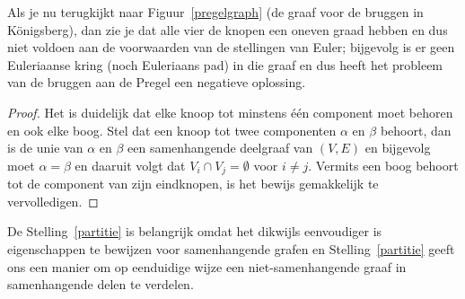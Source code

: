 Als je nu terugkijkt naar Figuur~\ref{pregelgraph} (de graaf voor de bruggen in K\"onigsberg), dan zie je dat
alle vier de knopen een oneven graad hebben en dus niet voldoen aan de
voorwaarden van de stellingen van Euler; bijgevolg is er geen
Euleriaanse kring (noch Euleriaans pad) in die graaf en dus heeft het
probleem van de bruggen aan de Pregel een negatieve oplossing.







\begin{proof} Het is duidelijk dat elke knoop tot minstens
\'{e}\'{e}n component moet behoren en ook elke boog. Stel dat een
knoop tot twee componenten $\alpha$ en $\beta$ behoort, dan is de unie
van $\alpha$ en $\beta$ een samenhangende deelgraaf van $(V,E)$ en
bijgevolg moet $\alpha = \beta$ en daaruit volgt dat $V_{i} \cap V_{j}
= \emptyset$ voor $i \neq j$. Vermits een boog behoort tot de
component van zijn eindknopen, is het bewijs gemakkelijk te vervolledigen.
\end{proof}


De Stelling~\ref{partitie} is belangrijk omdat het dikwijls
eenvoudiger is eigenschappen te bewijzen voor samenhangende grafen en
Stelling~\ref{partitie} geeft ons een manier om op eenduidige wijze
een niet-samenhangende graaf in samenhangende delen te verdelen.



